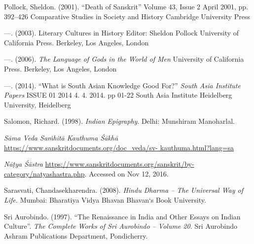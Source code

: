 \begin{thebibliography}{99}
  Pollock, Sheldon. (2001). “Death of Sanskrit” Volume 43, Issue 2 April 2001, pp. 392–426 Comparative Studies in Society and History Cambridge University Press

  —. (2003). Literary Cultures in History Editor: Sheldon Pollock University of California Press. Berkeley, Los Angeles, London

  —. (2006). \textit{The Language of Gods in the World of Men} University of California Press. Berkeley, Los Angeles, London

  —. (2014). “What is South Asian Knowledge Good For?” \textit{South Asia Institute Papers} ISSUE 01 2014 4. 4. 2014. pp 01-22 South Asia Institute Heidelberg University, Heidelberg

  Salomon, Richard. (1998). \textit{Indian Epigraphy}. Delhi: Munshiram Manoharlal.

  \textit{Sāma Veda Saṁhitā Kauthuma Śākhā} \url{https://www.sanskritdocuments.org/doc_veda/sv- kauthuma.html?lang=sa}

  \textit{Nāṭya Śāstra} \url{https://www.sanskritdocuments.org/sanskrit/by-category/natyashastra.php}. Accessed on Nov 12, 2016.

  Sarasvati, Chandasekharendra. (2008). \textit{Hindu Dharma – The Universal Way of Life.} Mumbai: Bharatiya Vidya Bhavan Bhavan‘s Book University.

  Sri Aurobindo. (1997). “The Renaissance in India and Other Essays on Indian Culture”. \textit{The Complete Works of Sri Aurobindo – Volume 20.} Sri Aurobindo Ashram Publications Department, Pondicherry.

 \end{thebibliography}

